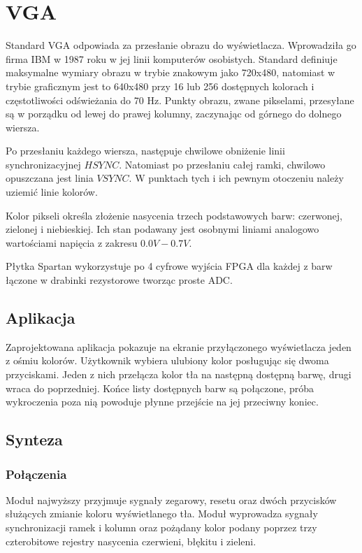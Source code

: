 \documentclass[a4paper,12pt]{article}
\begin{document}
\newpage
\section{VGA}
Standard VGA odpowiada za przesłanie obrazu do wyświetlacza. Wprowadziła go firma IBM w 1987 roku w jej linii komputerów osobistych. Standard definiuje maksymalne wymiary obrazu w trybie znakowym jako 720x480, natomiast w trybie  graficznym jest to 640x480 przy 16 lub 256 dostępnych kolorach i częstotliwości odświeżania do 70 Hz. Punkty obrazu, zwane pikselami, przesyłane są w porządku od lewej do prawej kolumny, zaczynając od górnego do dolnego wiersza.

Po przesłaniu każdego wiersza, następuje chwilowe obniżenie linii synchronizacyjnej $HSYNC$. Natomiast po przesłaniu całej ramki, chwilowo opuszczana jest linia $VSYNC$. W punktach tych i ich pewnym otoczeniu należy uziemić linie kolorów.

Kolor pikseli określa złożenie nasycenia trzech podstawowych barw: czerwonej, zielonej i niebieskiej. Ich stan podawany jest osobnymi liniami analogowo wartościami napięcia z zakresu $0.0V - 0.7V$.

Płytka Spartan wykorzystuje po 4 cyfrowe wyjścia FPGA dla każdej z barw łączone w drabinki rezystorowe tworząc proste ADC.

\subsection{Aplikacja}
Zaprojektowana aplikacja pokazuje na ekranie przyłączonego wyświetlacza jeden z ośmiu kolorów. Użytkownik wybiera ulubiony kolor posługując się dwoma przyciskami. Jeden z nich przełącza kolor tła na następną dostępną barwę, drugi wraca do poprzedniej. Końce listy dostępnych barw są połączone, próba wykroczenia poza nią powoduje płynne przejście na jej przeciwny koniec.

\subsection{Synteza}

\subsubsection{Połączenia}

Moduł najwyższy przyjmuje sygnały zegarowy, resetu oraz dwóch przycisków służących zmianie koloru wyświetlanego tła. Moduł wyprowadza sygnały synchronizacji ramek i kolumn oraz pożądany kolor podany poprzez trzy czterobitowe rejestry nasycenia czerwieni, błękitu i zieleni.
\end{document}
